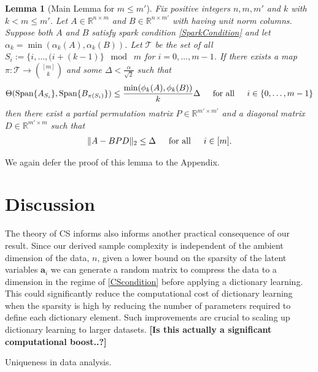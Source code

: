 \documentclass[journal, onecolumn]{IEEEtran}
\newtheorem{lemma}{Lemma}
\begin{document}
\begin{lemma}[Main Lemma for $m \leq m'$]\label{MainLemma2}
Fix positive integers $n, m, m'$ and $k$ with $k < m \leq m'$. Let $A \in \mathbb{R}^{n \times m}$ and $B \in \mathbb{R}^{n \times m'}$ with having unit norm columns. Suppose both $A$ and $B$ satisfy spark condition \eqref{SparkCondition} and let $\alpha_k = \min(\alpha_k(A), \alpha_k(B))$. Let $\mathcal{T}$ be the set of all $S_i := \{i, \ldots, (i + (k-1) \} \;\bmod\; m$ for $i = 0, \ldots, m-1$. If there exists a map $\pi: \mathcal{T} \to {[m] \choose k}$ and some $\Delta < \frac{\alpha}{\sqrt{2}}$ such that 
\begin{equation}\label{GapUpperBound2}
\Theta(\text{Span}\{A_{S_i}\}, \text{Span}\{B_{\pi(S_i)}\}) \leq \frac{ \min(\phi_k(A), \phi_k(B)) }{k} \Delta \indent \text{for all} \indent i \in \{0, \ldots, m-1\}
\end{equation}
%
then there exist a partial permutation matrix $P \in \mathbb{R}^{m' \times m'}$ and a diagonal matrix $D \in \mathbb{R}^{m' \times m}$ such that
\begin{align}
\|A - BPD\|_2 \leq \Delta \indent \text{for all} \indent i \in [m].
\end{align}
\end{lemma}

We again defer the proof of this lemma to the Appendix.


\section{Discussion}

The theory of CS informs also informs another practical consequence of our result. Since our derived sample complexity is independent of the ambient dimension of the data, $n$, given a lower bound on the sparsity of the latent variables $\mathbf{a}_i$ we can generate a random matrix to compress the data to a dimension in the regime of \eqref{CScondition} before applying a dictionary learning. This could significantly reduce the computational cost of dictionary learning when the sparsity is high by reducing the number of parameters required to define each dictionary element. Such improvements are crucial to scaling up dictionary learning to larger datasets. \textbf{[Is this actually a significant computational boost..?]}

Uniqueness in data analysis.
\end{document}
